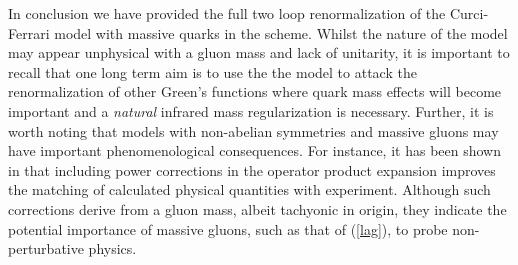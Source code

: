 \documentclass[a4paper,11pt]{article}
\providecommand{\MSbar}{\overline{\mbox{MS}}}
\begin{document}
In conclusion we have provided the full two loop renormalization of the 
Curci-Ferrari model with massive quarks in the \myHighlight{$\MSbar$}\coordHE{} scheme. Whilst the 
nature of the model may appear unphysical with a gluon mass and lack of 
unitarity, it is important to recall that one long term aim is to use the the 
model to attack the renormalization of other Green's functions where quark mass
effects will become important and a {\em natural} infrared mass regularization 
is necessary. Further, it is worth noting that models with non-abelian 
symmetries and massive gluons may have important phenomenological consequences.
For instance, it has been shown in \cite{33} that including \coordHE{} power 
corrections in the operator product expansion improves the matching of 
calculated physical quantities with experiment. Although such corrections 
derive from a gluon mass, albeit tachyonic in origin, they indicate the 
potential importance of massive gluons, such as that of (\ref{lag}), to probe 
non-perturbative physics.  
\end{document}
